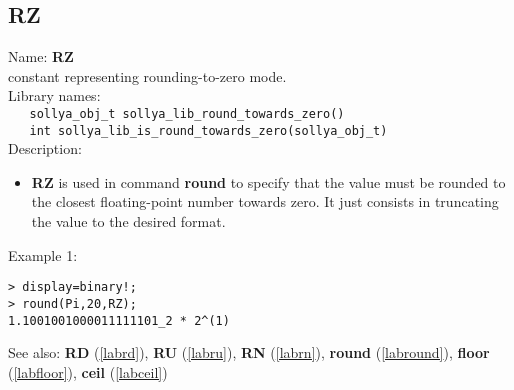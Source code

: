 \subsection{RZ}
\label{labrz}
\noindent Name: \textbf{RZ}\\
\phantom{aaa}constant representing rounding-to-zero mode.\\[0.2cm]
\noindent Library names:\\
\verb|   sollya_obj_t sollya_lib_round_towards_zero()|\\
\verb|   int sollya_lib_is_round_towards_zero(sollya_obj_t)|\\[0.2cm]
\noindent Description: \begin{itemize}

\item \textbf{RZ} is used in command \textbf{round} to specify that the value must be rounded
   to the closest floating-point number towards zero. It just consists in 
   truncating the value to the desired format.
\end{itemize}
\noindent Example 1: 
\begin{center}\begin{minipage}{15cm}\begin{Verbatim}[frame=single]
> display=binary!;
> round(Pi,20,RZ);
1.1001001000011111101_2 * 2^(1)
\end{Verbatim}
\end{minipage}\end{center}
See also: \textbf{RD} (\ref{labrd}), \textbf{RU} (\ref{labru}), \textbf{RN} (\ref{labrn}), \textbf{round} (\ref{labround}), \textbf{floor} (\ref{labfloor}), \textbf{ceil} (\ref{labceil})
